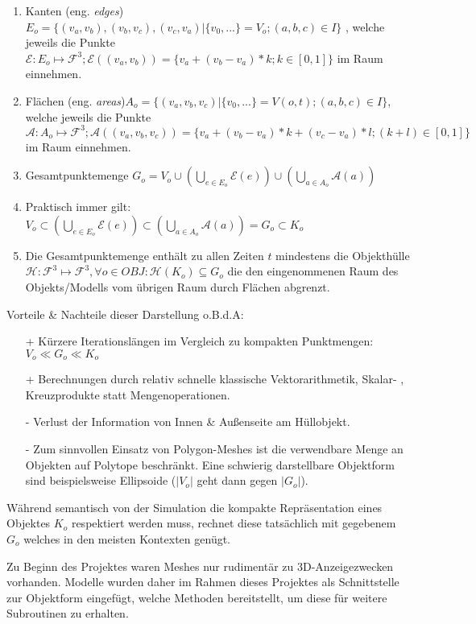 \begin{enumerate}
\item Kanten (eng. \textit{edges}) $E_o = \{(v_a, v_b), (v_b, v_c),(v_c, v_a) | \{v_0, ...\} = V_o;(a, b, c) \in I\} $
, welche jeweils die Punkte $\mathcal{E}:E_o\mapsto\mathcal{F}^3; \mathcal{E}((v_a, v_b)) = \{v_a + (v_b-v_a)* k; k \in [0,1]\} $ im Raum einnehmen.
\item Flächen (eng. \textit{areas})$ A_o = \{(v_a, v_b, v_c) | \{v_0, ... \} = V(o, t); (a, b, c) \in I\} $,\\
welche jeweils die Punkte $\mathcal{A}:A_o\mapsto\mathcal{F}^3; \mathcal{A}((v_a, v_b, v_c)) = \{v_a + (v_b-v_a)* k + (v_c-v_a)*l; (k+l) \in [0,1]\} $ im Raum einnehmen.
\item Gesamtpunktemenge $G_o = V_o \cup (\bigcup_{e\in E_o} \mathcal{E}(e)) \cup (\bigcup_{a\in A_o} \mathcal{A}(a)) $
\item Praktisch immer gilt: $V_o \subset (\bigcup_{e\in E_o} \mathcal{E}(e)) \subset (\bigcup_{a\in A_o} \mathcal{A}(a)) = G_o \subset K_o$
\item Die Gesamtpunktemenge enthält zu allen Zeiten $t$ mindestens die Objekthülle $\mathcal{H}: \mathcal{F}^3 \mapsto \mathcal{F}^3, \forall o\in OBJ: \mathcal{H}(K_o) \subseteq G_o$ die den eingenommenen Raum des Objekts/Modells vom übrigen Raum durch Flächen abgrenzt.
\end{enumerate}

Vorteile \& Nachteile dieser Darstellung o.B.d.A:
\begin{itemize}
\item [+]Kürzere Iterationslängen im Vergleich zu kompakten Punktmengen: $V_o \ll G_o \ll K_o$
\item [+]Berechnungen durch relativ schnelle klassische Vektorarithmetik, Skalar- , Kreuzprodukte statt Mengenoperationen.
\item [-]Verlust der Information von Innen \& Außenseite am Hüllobjekt.
\item [-]Zum sinnvollen Einsatz von Polygon-Meshes ist die verwendbare Menge an Objekten auf Polytope beschränkt. Eine schwierig darstellbare Objektform sind beispielsweise Ellipsoide ($|V_o|$ geht dann gegen $|G_o|$).
\end{itemize}

Während semantisch von der Simulation die kompakte Repräsentation eines Objektes $K_o$ respektiert werden muss, rechnet diese tatsächlich mit gegebenem $G_o$ welches in den meisten Kontexten genügt.

Zu Beginn des Projektes waren Meshes nur rudimentär zu 3D-Anzeigezwecken vorhanden. Modelle wurden daher im Rahmen dieses Projektes als Schnittstelle zur Objektform eingefügt, welche Methoden bereitstellt, um diese für weitere Subroutinen zu erhalten.

